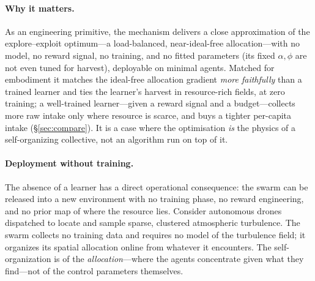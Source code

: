 \documentclass{article}
\begin{document}
\paragraph{Why it matters.} As an engineering primitive, the mechanism delivers a close approximation of the
explore--exploit optimum---a load-balanced, near-ideal-free allocation---with no model, no reward signal, no
training, and no fitted parameters (its fixed $\alpha,\phi$ are not even tuned for harvest), deployable on
minimal agents. Matched for embodiment it matches the ideal-free allocation gradient \emph{more faithfully} than
a trained learner and ties the learner's harvest in resource-rich fields, at zero training; a well-trained
learner---given a reward signal and a budget---collects more raw intake only where resource is scarce, and buys
a tighter per-capita intake (\S\ref{sec:compare}). It is a case where the optimisation \emph{is} the physics of a self-organizing
collective, not an algorithm run on top of it.

\paragraph{Deployment without training.} The absence of a learner has a direct operational consequence: the
swarm can be released into a new environment with no training phase, no reward engineering, and no prior map of
where the resource lies. Consider autonomous drones dispatched to locate and sample sparse, clustered
atmospheric turbulence. The swarm collects no training data and requires no model of the turbulence field; it
organizes its spatial allocation online from whatever it encounters. The self-organization is of the
\emph{allocation}---where the agents concentrate given what they find---not of the control parameters
themselves.
\end{document}

